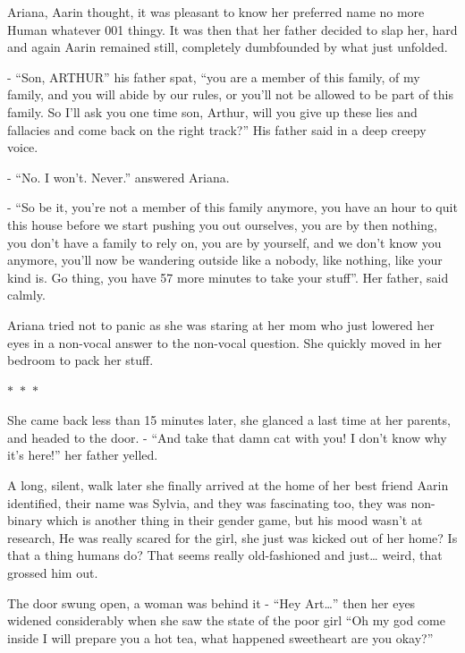 \documentclass[hidelinks,12pt,a4paper]{book}
\newcommand\sep{\begin{center}
  \boldmath $\ast$~$\ast$~$\ast$
\end{center}}
\begin{document}
Ariana, Aarin thought, it was pleasant to know her preferred name no more Human whatever 001 thingy.\newline
It was then that her father decided to slap her, hard and again Aarin remained still, 
completely dumbfounded by what just unfolded.\par
\bigskip

- “Son, ARTHUR” his father spat, “you are a member of this family, of my family, and you will abide by our rules,
or you'll not be allowed to be part of this family. So I'll ask you one time son, Arthur, 
will you give up these lies and fallacies and come back on the right track?” His father said in a deep creepy voice.\newline

- “No. I won't. Never.” answered Ariana.\newline

- “So be it, you're not a member of this family anymore, you have an hour 
to quit this house before we start pushing you out ourselves, you are by then nothing, 
you don't have a family to rely on, you are by yourself, and we don't know you anymore, 
you'll now be wandering outside like a nobody, like nothing, like your kind is. Go thing, 
you have 57 more minutes to take your stuff”. Her father, said calmly.\par
\bigskip

Ariana tried not to panic as she was staring at her mom who just lowered her eyes in a 
non-vocal answer to the non-vocal question. She quickly moved in her bedroom to pack her stuff.

\sep 

She came back less than 15 minutes later, she glanced a last time at her parents, and headed to the door.\newline
- “And take that damn cat with you! I don't know why it's here!” her father yelled.\par
\bigskip

A long, silent, walk later she finally arrived at the home of her best friend Aarin identified, 
their name was Sylvia, and they was fascinating too, they was non-binary which is another thing in their 
gender game, but his mood wasn't at research, He was really scared for the girl, she just was kicked out of
 her home? Is that a thing humans do? That seems really old-fashioned and just… weird, that grossed him out.\par
 \bigskip

The door swung open, a woman was behind it\newline
- “Hey Art…” then her eyes widened considerably when she saw the state of the poor girl 
“Oh my god come inside I will prepare you a hot tea, what happened sweetheart are you okay?”\par
\bigskip
\end{document}
